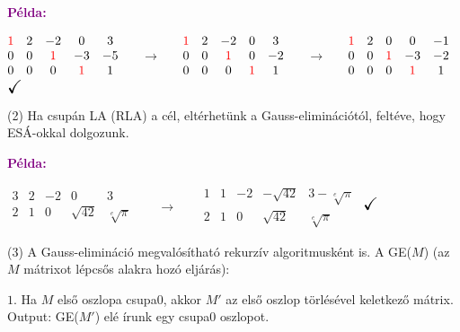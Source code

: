 \documentclass[../szamtud.tex]{subfiles}
\begin{document}
        \textcolor{purple}{\textbf{Példa:}}

        \;\;\;\;\;\;\;
        $ \begin{matrix}
            \textcolor{red}{1} & 2 & -2 & 0 & 3 \\
            0 & 0 & \textcolor{red}{1} & -3 & -5 \\
            0 & 0 & 0 & \textcolor{red}{1} & 1 
        \end{matrix}  $ 
        $\;\;\;\;\;\rightarrow\;\;\;\;\;$
        $ \begin{matrix}
            \textcolor{red}{1} & 2 & -2 & 0 & 3 \\
            0 & 0 & \textcolor{red}{1} & 0 & -2 \\
            0 & 0 & 0 & \textcolor{red}{1} & 1 
        \end{matrix}  $
        $\;\;\;\;\;\rightarrow\;\;\;\;\;$
        $ \begin{matrix}
            \textcolor{red}{1} & 2 & 0 & 0 & -1 \\
            0 & 0 & \textcolor{red}{1} & -3 & -2 \\
            0 & 0 & 0 & \textcolor{red}{1} & 1 
        \end{matrix}  $
        $\Large\checkmark$

        (2) Ha csupán LA (RLA) a cél, eltérhetünk a Gauss-eliminációtól, feltéve, hogy ESÁ-okkal dolgozunk.

        \textcolor{purple}{\textbf{Példa:}}

        \;\;\;\;\;\;\;\;\;\;\;\;\;\;\;\;\;\;\;\;\;
        $ \begin{matrix}
            3 & 2 & -2 & 0 & 3 \\
            2 & 1 & 0 & \sqrt{42} & \sqrt[e]{\pi} 
        \end{matrix}  $
        $\;\;\;\;\;\rightarrow\;\;\;\;\;$
        $ \begin{matrix}
            1 & 1 & -2 & -\sqrt{42} & 3-\sqrt[e]{\pi} \\
            2 & 1 & 0 & \sqrt{42} & \sqrt[e]{\pi} 
        \end{matrix}  $
        $\Large\checkmark$

        (3) A Gauss-elimináció megvalósítható rekurzív algoritmusként is. A GE($M$) (az $M$ mátrixot lépcsős alakra hozó eljárás):

        $\boxed{1.}$ Ha $M$ első oszlopa csupa0, akkor $M'$ az első oszlop törlésével keletkező mátrix. Output: GE($M'$) elé írunk egy csupa0 oszlopot.
\end{document}
